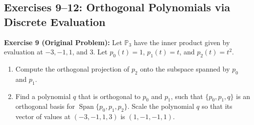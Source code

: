\documentclass[11pt, letterpaper]{article}
\theoremstyle{definition}
\theoremstyle{remark}
\begin{document}
\subsection{Exercises 9--12: Orthogonal Polynomials via Discrete Evaluation}

\textbf{Exercise 9 (Original Problem):} Let $\mathbb{P}_3$ have the inner product given by evaluation at $-3, -1, 1$, and $3$. Let $p_0(t) = 1$, $p_1(t) = t$, and $p_2(t) = t^2$.
\begin{enumerate}[label=\textbf{\alph*.}]
    \item Compute the orthogonal projection of $p_2$ onto the subspace spanned by $p_0$ and $p_1$.
    \item Find a polynomial $q$ that is orthogonal to $p_0$ and $p_1$, such that $\{p_0, p_1, q\}$ is an orthogonal basis for $\operatorname{Span}\{p_0, p_1, p_2\}$. Scale the polynomial $q$ so that its vector of values at $(-3, -1, 1, 3)$ is $(1, -1, -1, 1)$.
\end{enumerate}
\end{document}
